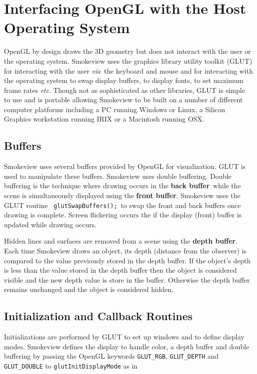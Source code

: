 \documentclass[11pt,twoside]{book}
\begin{document}
\chapter{Interfacing OpenGL with the Host Operating System}
OpenGL by design draws
the 3D geometry but does not interact with the user or the
operating system. Smokeview uses the graphics library utility
toolkit (GLUT) for interacting with the user {\em via}\ the
keyboard and mouse and for interacting with the operating system
to swap display buffers, to display fonts, to set maximum frame
rates {\em etc}. Though not as sophisticated as other libraries,
GLUT is simple to use and is portable allowing Smokeview to be
built on a number of different computer platforms including a PC
running Windows or Linux, a Silicon Graphics workstation running
IRIX or a Macintosh running OSX.

\section{Buffers} Smokeview uses several buffers provided by
OpenGL for visualization.  GLUT is used to manipulate these
buffers. Smokeview uses double buffering.  Double buffering is the technique where drawing occurs in the
{\bf back buffer}\ while the scene is simultaneously displayed using
the {\bf front buffer}. Smokeview uses the GLUT routine {\tt
glutSwapBuffers();}\ to swap the front and back buffers once
drawing is complete. Screen flickering occurs the if the display (front) buffer is updated while drawing occurs.

Hidden lines and surfaces are removed from a scene using the {\bf
depth buffer}.  Each time Smokeview draws an object, its depth
(distance from the observer) is compared to the value previously
stored in the depth buffer.  If the object's depth is less than
the value stored in the depth buffer then the object is considered
visible and the new depth value is store in the buffer. Otherwise
the depth buffer remains unchanged and the object is considered
hidden.

\section{Initialization and Callback Routines}
Initializations are performed by GLUT to set up windows and to
define display modes.  Smokeview defines the display to handle
color, a depth buffer and double buffering by passing the OpenGL
keywords {\tt GLUT\_RGB}, {\tt GLUT\_DEPTH} and {\tt GLUT\_DOUBLE}
to {\tt glutInitDisplayMode} as in
\end{document}
